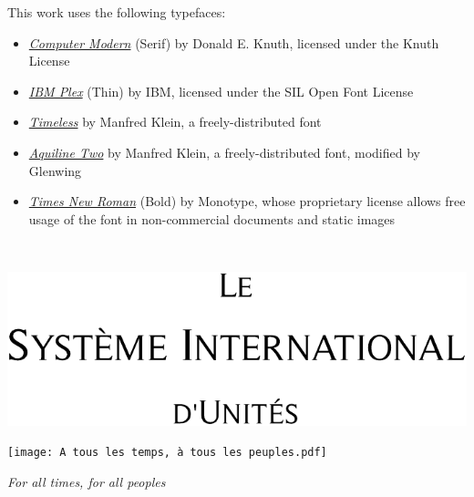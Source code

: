 \documentclass[letterpaper]{article}
\renewcommand{\,}{\hspace{0.2em}} %
\begin{document}
This work uses the following typefaces:
\begin{itemize}
\setlength\itemsep{0.25em}
\item{\textsl{\href{https://www.ctan.org/tex-archive/fonts/cm/}{Computer Modern}} (Serif) by Donald E. Knuth, licensed under the Knuth License}
\item{\textsl{\href{https://github.com/IBM/plex}{IBM Plex}} (Thin) by IBM, licensed under the SIL Open Font License}
\item{\textsl{\href{http://fontpro.com/timeless-font-5159}{Timeless}} by Manfred Klein, a freely-distributed font}
\item{\textsl{\href{http://fontpro.com/aquiline-two-font-3337}{Aquiline Two}} by Manfred Klein, a freely-distributed font, modified by Glenwing}
\item{\textsl{\href{https://catalog.monotype.com/font/monotype/times-new-roman/bold}{Times New Roman}} (Bold) by Monotype, whose proprietary license allows free usage of the font in non-commercial documents and static images}
\end{itemize}


\setlength\lineskip{1.2em}
\setlength{\parskip}{0em}

\newpage


~
\vspace{2cm}

\begin{center}
\includegraphics{Le Système International d'Unités Timeless.pdf}
\end{center}

\vspace{6cm}

\begin{center}
\texttt{[image: A tous les temps, à tous les peuples.pdf]}
\end{center}

\vspace{2mm}

\begin{center}
\huge\textsl{For all times, for all peoples}
\end{center}
\end{document}
